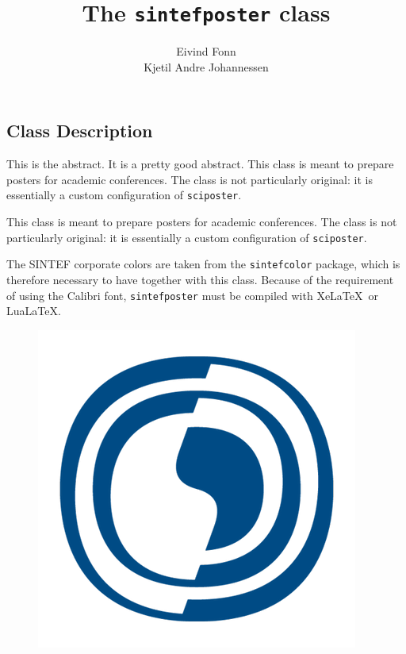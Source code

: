 \documentclass{sintefposter}
\title{The \texttt{sintefposter} class}
\author{Eivind Fonn \\ Kjetil Andre Johannessen }
\institute{SINTEF Digital, Dept. of Mathematics and Cybernetics, Trondheim, Norway}
\begin{document}
\maketitle

\begin{multicols}{3}
\section*{Class Description}
\begin{tcolorbox}[colback=sinteflightgrey,colframe=sintefblue,title=My nice heading]
  This is the abstract. It is a pretty good abstract.
  This class is meant to prepare posters for academic conferences.
  The class is not particularly original: it is essentially a custom configuration
  of \texttt{sciposter}.
\end{tcolorbox}
This class is meant to prepare posters for academic conferences.
The class is not particularly original: it is essentially a custom configuration
of \texttt{sciposter}.

The SINTEF corporate colors are taken from the \texttt{sintefcolor} package,
which is therefore necessary to have together with this class.
Because of the requirement of using the Calibri font, \texttt{sintefposter} must
be compiled with Xe\LaTeX\ or Lua\LaTeX.

\begin{figure}
  \includegraphics[width=0.8\linewidth]{testimage}
\end{figure}


\end{multicols}
\end{document}
